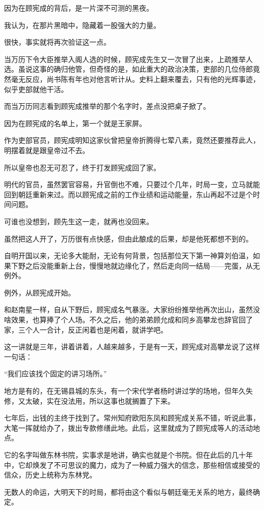 \begin{multicols}{\theparacolNo}
因为在顾宪成的背后，是一片深不可测的黑夜。

我认为，在那片黑暗中，隐藏着一股强大的力量。

很快，事实就将再次验证这一点。

当万历下令大臣推举入阁人选的时候，顾宪成先生又一次冒了出来，上疏推举人选。虽说这事的确归他管，但奇怪的是，如此重大的政治决策，吏部的几位侍郎竟然毫无反应，尚书陈有年也对他言听计从。史料上翻来覆去，只有他的光辉事迹，似乎吏部就他干活。

而当万历同志看到顾宪成推举的那个名字时，差点没把桌子掀了。

因为在顾宪成的名单上，第一个就是王家屏。

作为吏部官员，顾宪成明知这家伙曾把皇帝折腾得七荤八素，竟然还要推荐此人，明摆着就是跟皇帝过不去。

所以皇帝也忍无可忍了，终于打发顾宪成回了家。

明代的官员，虽然罢官容易，升官倒也不难，只要过个几年，时局一变，立马就能回到朝廷重新来过。而以顾宪成之前的工作业绩和运动能量，东山再起不过是个时间问题。

可谁也没想到，顾先生这一走，就再也没回来。

虽然把这人开了，万历很有点快感，但由此酿成的后果，却是他死都想不到的。

自明开国以来，无论多大能耐，无论有何背景，包括那位天下第一神算刘伯温，如果下野之后没能重新上台，慢慢地就边缘化了，然后走向同一结局——完蛋，从无例外。

例外，从顾宪成开始。

和赵南星一样，自从下野后，顾宪成名气暴涨。大家纷纷推举他再次出山，虽然没啥效果，也算捧了个人场。不久之后，他的弟弟顾允成和同乡高攀龙也辞官回了家，三个人一合计，反正闲着也是闲着，就讲学吧。

这一讲就是三年，讲着讲着，人越来越多，于是有一天，顾宪成对高攀龙说了这样一句话：

“我们应该找个固定的讲习场所。”

地方是有的，在无锡县城的东头，有一个宋代学者杨时讲过学的场地，但年久失修，又太破，实在没法用，所以这事也就搁置了下来。

七年后，出钱的主终于找到了。常州知府欧阳东凤和顾宪成关系不错，听说此事，大笔一挥就给办了，拨出专款修缮此地。此后，这里就成为了顾宪成等人的活动地点。

它的名字叫做东林书院，实事求是地讲，确实也就是个书院。但在此后的几十年中，它却焕发了不可思议的魔力，成为了一种威力强大的信念，那些相信或接受的信众，历史上统称为东林党。

无数人的命运，大明天下的时局，都将由这个看似与朝廷毫无关系的地方，最终确定。


\end{multicols}
